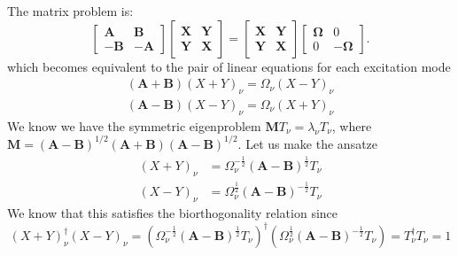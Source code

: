 The matrix problem is:
\begin{equation}
\begin{bmatrix}
\textbf{A} & \textbf{B} \\
-\textbf{B} & -\textbf{A}
\end{bmatrix}
\begin{bmatrix}
\textbf{X}&\textbf{Y} \\
\textbf{Y} &\textbf{X}
\end{bmatrix}
= 
\begin{bmatrix}
\textbf{X} & \textbf{Y}\\
\textbf{Y} & \textbf{X}
\end{bmatrix}
\begin{bmatrix}
\boldsymbol{\Omega } & 0 \\
0 & -\boldsymbol{\Omega }
\end{bmatrix}
.
\end{equation}
which becomes equivalent to the pair of linear equations for each excitation mode
\begin{equation}
\begin{split}
    \left(\textbf{A} + \textbf{B}\right) \left(X + {Y}\right)_\nu = \Omega_\nu \left({X} - {Y}\right)_\nu \\
    \left(\textbf{A} - \textbf{B}\right) \left(X - {Y}\right)_\nu = \Omega_\nu \left(X + {Y}\right)_\nu
\label{eqn:A_B}
\end{split}
\end{equation}
We know we have the symmetric eigenproblem $\bm{M}T_\nu = \lambda_\nu T_\nu$, where $\bm{M}=(\bm{A}-\bm{B})^{1/2}(\bm{A}+\bm{B})(\bm{A}-\bm{B})^{1/2}$. Let us make the ansatze 
\begin{equation}
\begin{split}
    \left({X} + {Y}\right)_\nu &= {\Omega }_\nu^{-\frac{1}{2}} \left(\textbf{A}-\textbf{B}\right)^{\frac{1}{2}}T_\nu \\
    \left({X} - {Y}\right)_\nu &= {\Omega }_\nu^{\frac{1}{2}} \left(\textbf{A}-\textbf{B}\right)^{-\frac{1}{2}}T_\nu
\label{eqn:XY_ansatz}
\end{split}
\end{equation}
We know that this satisfies the biorthogonality relation since
\begin{equation}
    \left({X} + {Y}\right)_\nu^\dagger \left({X} - {Y}\right)_\nu = \left({\Omega }_\nu^{-\frac{1}{2}} \left(\textbf{A}-\textbf{B}\right)^{\frac{1}{2}}T_\nu\right)^\dagger \left({\Omega }_\nu^{\frac{1}{2}} \left(\textbf{A}-\textbf{B}\right)^{-\frac{1}{2}}T_\nu\right) = T_\nu^\dagger T_\nu = {1}
\end{equation}
